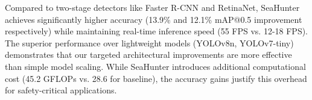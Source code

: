 \documentclass[lettersize,journal]{IEEEtran}
\begin{document}
Compared to two-stage detectors like Faster R-CNN and RetinaNet, SeaHunter achieves significantly higher accuracy (13.9\% and 12.1\% mAP@0.5 improvement respectively) while maintaining real-time inference speed (55 FPS vs. 12-18 FPS). The superior performance over lightweight models (YOLOv8n, YOLOv7-tiny) demonstrates that our targeted architectural improvements are more effective than simple model scaling. While SeaHunter introduces additional computational cost (45.2 GFLOPs vs. 28.6 for baseline), the accuracy gains justify this overhead for safety-critical applications.

\begin{table}[htbp]
\caption{Comparison with SOTA Models on SeaDronesSee Dataset}
\begin{center}
\label{tab:comparison}
\end{center}
\end{table}
\end{document}
